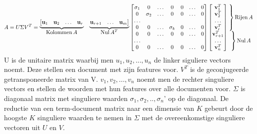 \[
   A= U\Sigma V^T=
  \begin{matrix}
    \underbrace{\left[\begin{matrix}\vect u_1 & \vect u_2 & \dots & \vect u_r\end{matrix}\right.}& 
    \underbrace{\left.\begin{matrix}\vect u_{r+1} & \dots &  \vect u_m\end{matrix}\right]}\\
    \col A & \nul A^T
  \end{matrix}
  \begin{bmatrix}
      \sigma_1 & 0 & \dots & 0 & 0 & \dots & 0 \\
         0 & \sigma_2  & \dots & 0 & 0 & \dots & 0 \\
         \dots& & & & &  \\
         0 & 0 & \dots & \sigma_k  & 0 & \dots & 0 \\
         0 & 0 & \dots & 0 & 0 & \dots & 0 \\
         \dots& & & & &  \\
         0 & 0 & \dots & 0 & 0 & \dots & 0 
  \end{bmatrix}
  \begin{bmatrix}
    \vect v_1^T \\ \vect v_2^T \\ \dots \\ \vect v_r^T \\
    \vect v_{r+1}^T \\ \dots \\ \vect v_n^T
  \end{bmatrix}
  \begin{matrix}
    \left.\vphantom{\begin{bmatrix}
       \vect v_1^T \\ \vect v_2^T \\ \dots \\ \vect v_r^T 
       \end{bmatrix}}\right\}\row A \\ 
    \left.\vphantom{\begin{bmatrix}
      \vect v_{r+1}^T \\ \dots \\ \vect v_n^T 
    \end{bmatrix}}\right\}\nul A
  \end{matrix}
\] 
\newline
U is de unitaire matrix waarbij men $u_1, u_2, ... , u_n$ de linker siguliere vectors noemt. Deze stellen een document met zijn features voor. $V^T$ is de geconjugeerde getransponeerde matrix van V. $v_1, v_2, ... , v_n$ noemt men de rechter singuliere vectors en stellen de woorden met hun features over alle documenten voor. $\Sigma$ is diagonaal matrix met singuliere waarden $\sigma_1,\sigma_2,..,\sigma_n$'  op de diagonaal. De reductie van een term-document matrix naar een dimensie van $K$ gebeurt door de hoogste $K$ singuliere waarden te nemen in $\Sigma$ met de overeenkomstige singuliere vectoren uit $U$ en $V$.    
